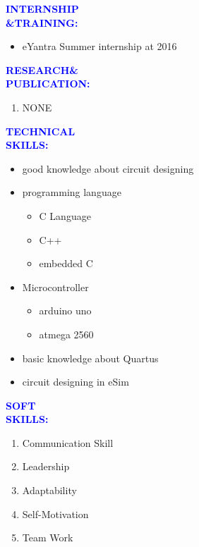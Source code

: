 \documentclass{article}
\begin{document}
\begin{flushleft}
	\textcolor{blue}{\textbf{INTERNSHIP\\\&TRAINING:}}
	\begin{itemize}
		\vspace{-0.29in}
		\addtolength{\itemindent}{1.0in}	
		\item eYantra Summer internship at 2016
	\end{itemize}
\end{flushleft}
\begin{flushleft}
	\textcolor{blue}{\textbf{RESEARCH\&\\\hspace{-0.05in}PUBLICATION:}}
	\begin{enumerate}
		\vspace{-0.29in}
		\addtolength{\itemindent}{1in}	
		\item NONE
	\end{enumerate}
\end{flushleft}
\begin{flushleft}
	\textcolor{blue}{\textbf{TECHNICAL\\SKILLS:}}
	\begin{itemize}
		\vspace{-0.29in}
		\addtolength{\itemindent}{1.0in}
		\item good knowledge about circuit designing
		\item programming language
		\begin{itemize}
			
			\addtolength{\itemindent}{1.0in}
			\item	C Language
			\item	C++
			\item embedded C
		\end{itemize} 
		\item Microcontroller
		\begin{itemize}
			\addtolength{\itemindent}{1.0in}
			\item arduino uno
			\item atmega 2560
		\end{itemize}
		\item basic knowledge about Quartus
		\item circuit designing in eSim
	\end{itemize}
\end{flushleft}
\begin{flushleft}
	\textcolor{blue}{\textbf{SOFT\\ SKILLS:}}
	\begin{enumerate}
		\vspace{-0.29in}
		\addtolength{\itemindent}{1.0in}
		\item Communication Skill
		\item Leadership
		\item Adaptability
		\item Self-Motivation
		\item Team Work
	\end{enumerate}
\end{flushleft}
\end{document}
